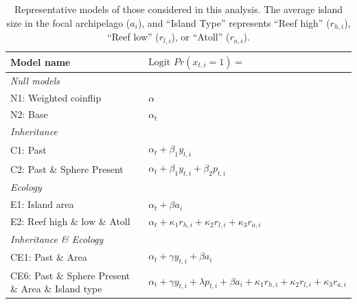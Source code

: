 \documentclass[11pt]{article}
\begin{document}
\begin{table}[t]
\begin{center}
\begin{footnotesize}
\begin{tabular}{p{7.5cm} p{7cm}}
\bf{Model name} & $ \text{Logit }Pr(x_{t,i}=1) =$\\
\hline
{\em Null models}& \\
\hline
N1: Weighted coinflip & $ \alpha $ \\
N2: Base & $ \alpha_t $ \\
\hline
{\em Inheritance} & \\
\hline
C1: Past & $\alpha_t + \beta_1 y_{t,i}$ \\
C2: Past \& Sphere Present & $\alpha_t + \beta_1 y_{t,i} + \beta_2 p_{t,i} $ \\
\hline
{\em Ecology} & \\
\hline
E1: Island area &  $\alpha_t + \beta a_i$ \\
E2: Reef high \& low \& Atoll & $\alpha_t + \kappa_1 r_{h,i} + \kappa_2 r_{l,i} + \kappa_3 r_{a,i}$ \\
\hline
{\em Inheritance \& Ecology} & \\
\hline
CE1: Past \& Area & $\alpha_t + \gamma y_{t,i} + \beta a_i$ \\
CE6: Past \& Sphere Present \& Area \& Island type & $\alpha_t + \gamma y_{t,i} + \lambda p_{t,i} + \beta a_i + \kappa_1 r_{h,i} + \kappa_2 r_{l,i} + \kappa_3 r_{a,i}$ \\
\hline
\end{tabular}
\end{footnotesize}
\end{center}
\caption{Representative models of those considered in this analysis. The average island size in the focal archipelago ($a_i$), and ``Island Type'' represents ``Reef high'' ($r_{h,i}$), ``Reef low'' ($r_{l,i}$), or ``Atoll'' ($r_{a,i}$).}
\label{tab:models}
\end{table}
\end{document}
